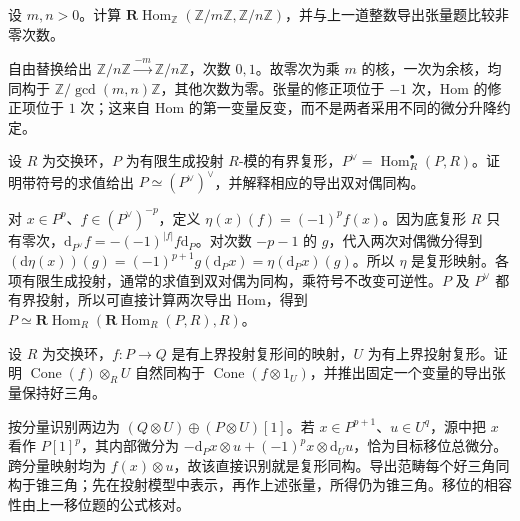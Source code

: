 \begin{exercise}\label{b4:ex:18-integer-derived-hom}
	设 \(m,n>0\)。计算 \(\mathbf R\operatorname{Hom}_{\mathbb Z}(\mathbb Z/m\mathbb Z,\mathbb Z/n\mathbb Z)\)，并与上一道整数导出张量题比较非零次数。
\end{exercise}
\begin{solution}
	自由替换给出 \(\mathbb Z/n\mathbb Z\xrightarrow{-m}\mathbb Z/n\mathbb Z\)，次数 \(0,1\)。故零次为乘 \(m\) 的核，一次为余核，均同构于 \(\mathbb Z/\gcd(m,n)\mathbb Z\)，其他次数为零。张量的修正项位于 \(-1\) 次，Hom 的修正项位于 \(1\) 次；这来自 Hom 的第一变量反变，而不是两者采用不同的微分升降约定。
\end{solution}

\begin{exercise}\label{b4:ex:18-finite-projective-bidual}
	设 \(R\) 为交换环，\(P\) 为有限生成投射 \(R\)-模的有界复形，\(P^\vee=\operatorname{Hom}_R^\bullet(P,R)\)。证明带符号的求值给出 \(P\simeq(P^\vee)^\vee\)，并解释相应的导出双对偶同构。
\end{exercise}
\begin{solution}
	对 \(x\in P^p\)、\(f\in(P^\vee)^{-p}\)，定义 \(\eta(x)(f)=(-1)^pf(x)\)。因为底复形 \(R\) 只有零次，\(\mathrm{d}_{P^\vee}f=-(-1)^{|f|}f\mathrm{d}_P\)。对次数 \(-p-1\) 的 \(g\)，代入两次对偶微分得到 \((\mathrm{d}\eta(x))(g)=(-1)^{p+1}g(\mathrm{d}_Px)=\eta(\mathrm{d}_Px)(g)\)。所以 \(\eta\) 是复形映射。各项有限生成投射，通常的求值到双对偶为同构，乘符号不改变可逆性。\(P\) 及 \(P^\vee\) 都有界投射，所以可直接计算两次导出 Hom，得到 \(P\simeq\mathbf R\operatorname{Hom}_R(\mathbf R\operatorname{Hom}_R(P,R),R)\)。
\end{solution}

\begin{exercise}\label{b4:ex:18-tensor-cone}
	设 \(R\) 为交换环，\(f:P\to Q\) 是有上界投射复形间的映射，\(U\) 为有上界投射复形。证明 \(\operatorname{Cone}(f)\otimes_RU\) 自然同构于 \(\operatorname{Cone}(f\otimes1_U)\)，并推出固定一个变量的导出张量保持好三角。
\end{exercise}
\begin{solution}
	按分量识别两边为 \((Q\otimes U)\oplus(P\otimes U)[1]\)。若 \(x\in P^{p+1}\)、\(u\in U^q\)，源中把 \(x\) 看作 \(P[1]^p\)，其内部微分为 \(-\mathrm{d}_Px\otimes u+(-1)^px\otimes \mathrm{d}_Uu\)，恰为目标移位总微分。跨分量映射均为 \(f(x)\otimes u\)，故该直接识别就是复形同构。导出范畴每个好三角同构于锥三角；先在投射模型中表示，再作上述张量，所得仍为锥三角。移位的相容性由上一移位题的公式核对。
\end{solution}

